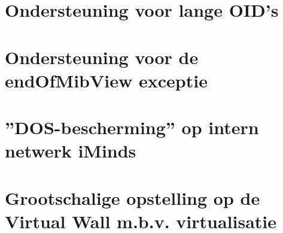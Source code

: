 \section{Ondersteuning voor lange OID's}
\label{probleem-lange-oids}

\section{Ondersteuning voor de endOfMibView exceptie}
\label{probleem-endofmibview-exceptie}

\section{''DOS-bescherming'' op intern netwerk iMinds}
\label{probleem-dos-bescherming}


\section{Grootschalige opstelling op de Virtual Wall m.b.v. virtualisatie}

